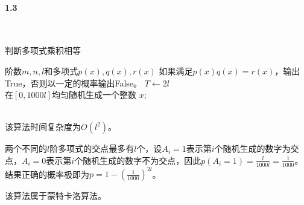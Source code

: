 \paragraph{1.3}~{}
\begin{algorithm}[H]  
    \caption{判断多项式乘积相等}  
    \begin{algorithmic}[1]
        \Require 阶数$m,n,l$和多项式$p(x),q(x),r(x)$
        \Ensure 如果满足$p(x)q(x)=r(x)$，输出True，否则以一定的概率输出False。
        \State $T \leftarrow 2l$
         \\
        \EndIf
            在$[0,1000l]$均匀随机生成一个整数 $x$;
             \\
            \EndIf
        \EndFor \\
    \end{algorithmic}
\end{algorithm}  

该算法时间复杂度为$O(l^2)$。

两个不同的$l$阶多项式的交点最多有$l$个，设$A_{i}=1$表示第$i$个随机生成的数字为交点，$A_{i}=0$表示第$i$个随机生成的数字不为交点，因此$p(A_{i}=1)=\frac{l}{1000l}=\frac{1}{1000}$。
结果正确的概率极即为$p=1-(\frac{1}{1000})^{2l}$。

该算法属于蒙特卡洛算法。